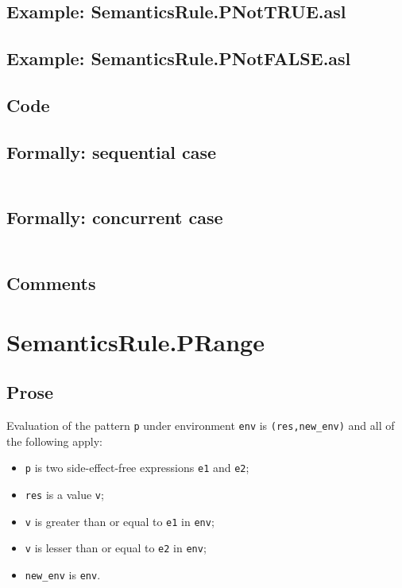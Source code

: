 \documentclass{book}
\begin{document}
    \subsection{Example: SemanticsRule.PNotTRUE.asl}

    \subsection{Example: SemanticsRule.PNotFALSE.asl}

  \subsection{Code}

  \subsection{Formally: sequential case}
  \begin{align}
  \end{align} 

  \subsection{Formally: concurrent case}
  \begin{align}
  \end{align} 

    \subsection{Comments}

\section{SemanticsRule.PRange \label{sec:SemanticsRule.PRange}}

    \subsection{Prose}
   Evaluation of the pattern \texttt{p} under environment \texttt{env} is
  \texttt{(res,new\_env)} and all of the following apply:
    \begin{itemize}
    \item \texttt{p} is two side-effect-free expressions \texttt{e1} and \texttt{e2};
    \item \texttt{res} is a value \texttt{v};
    \item \texttt{v} is greater than or equal to \texttt{e1} in \texttt{env};
    \item \texttt{v} is lesser than or equal to \texttt{e2} in \texttt{env};
    \item \texttt{new\_env} is \texttt{env}.
    \end{itemize}
\end{document}
